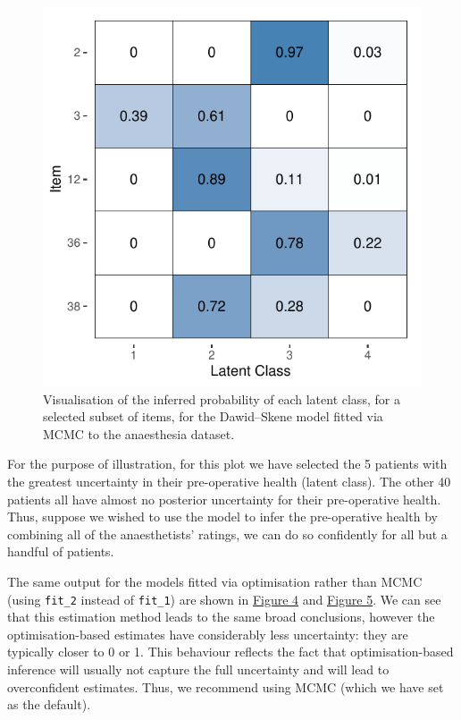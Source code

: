 \begin{figure}

{\centering \includegraphics{RJ-2023-064_files/figure-latex/plot-z-1} 

}

\caption{Visualisation of the inferred probability of each latent class, for a selected subset of items, for the Dawid--Skene model fitted via MCMC to the anaesthesia dataset.}\label{fig:plot-z}
\end{figure}

For the purpose of illustration, for this plot we have selected the 5 patients
with the greatest uncertainty in their pre-operative health (latent class). The
other 40 patients all have almost no posterior uncertainty for their
pre-operative health. Thus, suppose we wished to use the model to infer the
pre-operative health by combining all of the anaesthetists' ratings, we can do
so confidently for all but a handful of patients.

The same output for the models fitted via
optimisation rather than MCMC (using \texttt{fit\_2} instead of \texttt{fit\_1}) are
shown in \protect\hyperlink{fig:plot-theta-fit2}{Figure 4} and \protect\hyperlink{fig:plot-z-fit2}{Figure 5}. We can
see that this estimation method leads to the same broad conclusions, however the
optimisation-based estimates have considerably less uncertainty: they are
typically closer to 0 or 1. This behaviour reflects the fact that
optimisation-based inference will usually not capture the full uncertainty and
will lead to overconfident estimates. Thus, we recommend using MCMC (which we
have set as the default).





